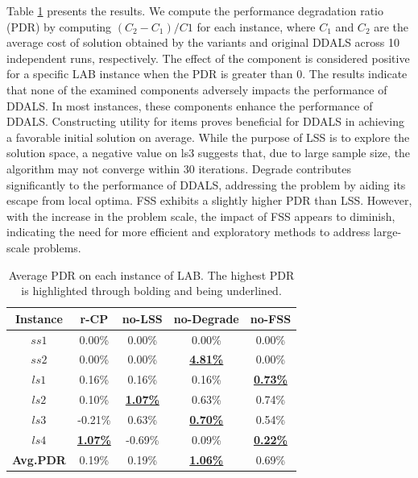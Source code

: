 \documentclass[lettersize,journal]{IEEEtran}
\begin{document}
Table \ref{result: ablation study} presents the results.
We compute the performance degradation ratio (PDR) by computing $(C_2-C_1)/C1$ for each instance, where $C_1$ and $C_2$ are the average cost of solution obtained by the variants and original DDALS across 10 independent runs, respectively.
The effect of the component is considered positive for a specific LAB instance when the PDR is greater than 0.  
The results indicate that none of the examined components adversely impacts the performance of DDALS.
In most instances, these components enhance the performance of DDALS.
Constructing utility for items proves beneficial for DDALS in achieving a favorable initial solution on average. 
While the purpose of LSS is to explore the solution space, a negative value on ls3 suggests that, due to large sample size, the algorithm may not converge within 30 iterations. 
Degrade contributes significantly to the performance of DDALS, addressing the problem by aiding its escape from local optima. 
FSS exhibits a slightly higher PDR than LSS.
However, with the increase in the problem scale, the impact of FSS appears to diminish, indicating the need for more efficient and exploratory methods to address large-scale problems.

\begin{table}[!t]
\centering
\caption{Average PDR on each instance of LAB. The highest PDR is highlighted through bolding and being underlined.}
\begin{tabular}{ccccc}
\toprule
\bfseries Instance & r-CP & no-LSS & no-Degrade & no-FSS  \\
\midrule
{\bfseries $ss1$} &0.00\% &0.00\% &0.00\% &0.00\% \\
{\bfseries $ss2$} &0.00\% &0.00\% &\underline{\bfseries 4.81\%} &0.00\% \\
{\bfseries $ls1$} &0.16\% &0.16\% &0.16\% &\underline{\bfseries 0.73\%} \\
{\bfseries $ls2$} &0.10\% &\underline{\bfseries 1.07\%} &0.63\% &0.74\% \\
{\bfseries $ls3$} &-0.21\% &0.63\% &\underline{\bfseries 0.70\%} &0.54\% \\
{\bfseries $ls4$} &\underline{\bfseries 1.07\%} &-0.69\% &0.09\% &\underline{\bfseries 0.22\%} \\
\midrule
{\bfseries Avg.PDR} &0.19\% &0.19\% &\underline{\bfseries 1.06\%} &0.69\% \\
\bottomrule
\end{tabular}
\label{result: ablation study}
\end{table}
\end{document}
